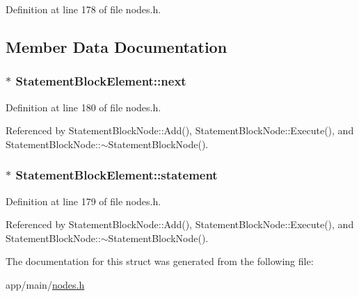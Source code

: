 Definition at line 178 of file nodes.\+h.



\subsection{Member Data Documentation}
\subsubsection[{\texorpdfstring{next}{next}}]{$\ast$ Statement\+Block\+Element\+::next}\hypertarget{structStatementBlockElement_aa6001c0b1578810f85004ae397da2387}{}\label{structStatementBlockElement_aa6001c0b1578810f85004ae397da2387}


Definition at line 180 of file nodes.\+h.



Referenced by Statement\+Block\+Node\+::\+Add(), Statement\+Block\+Node\+::\+Execute(), and Statement\+Block\+Node\+::$\sim$\+Statement\+Block\+Node().

\subsubsection[{\texorpdfstring{statement}{statement}}]{$\ast$ Statement\+Block\+Element\+::statement}\hypertarget{structStatementBlockElement_a9ac07a402a18f927cb895cdbd86d6a06}{}\label{structStatementBlockElement_a9ac07a402a18f927cb895cdbd86d6a06}


Definition at line 179 of file nodes.\+h.



Referenced by Statement\+Block\+Node\+::\+Add(), Statement\+Block\+Node\+::\+Execute(), and Statement\+Block\+Node\+::$\sim$\+Statement\+Block\+Node().



The documentation for this struct was generated from the following file\+:\begin{DoxyCompactItemize}
\item 
app/main/\hyperlink{nodes_8h}{nodes.\+h}\end{DoxyCompactItemize}
